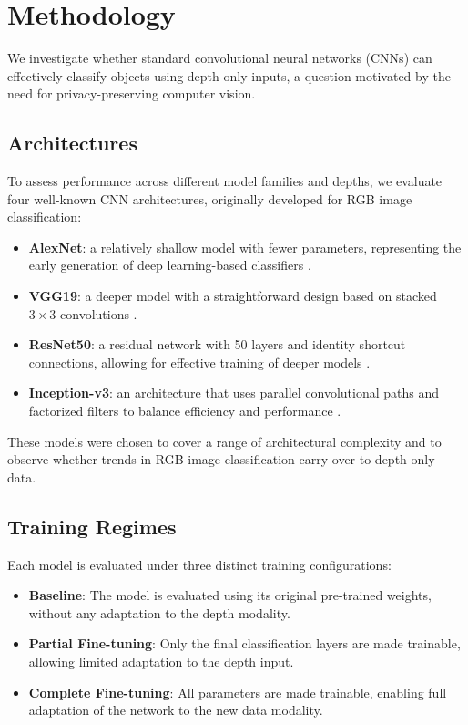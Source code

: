 \section{Methodology}

We investigate whether standard convolutional neural networks (CNNs) can effectively classify objects using depth-only inputs, a question motivated by the need for privacy-preserving computer vision.

\subsection{Architectures}

To assess performance across different model families and depths, we evaluate four well-known CNN architectures, originally developed for RGB image classification:

\begin{itemize}
    \item \textbf{AlexNet}: a relatively shallow model with fewer parameters, representing the early generation of deep learning-based classifiers \cite{alexnet}.
    \item \textbf{VGG19}: a deeper model with a straightforward design based on stacked $3 \times 3$ convolutions \cite{vgg19}.
    \item \textbf{ResNet50}: a residual network with 50 layers and identity shortcut connections, allowing for effective training of deeper models \cite{resnet50}.
    \item \textbf{Inception-v3}: an architecture that uses parallel convolutional paths and factorized filters to balance efficiency and performance \cite{inceptionv3}.
\end{itemize}

These models were chosen to cover a range of architectural complexity and to observe whether trends in RGB image classification carry over to depth-only data.

\subsection{Training Regimes}

Each model is evaluated under three distinct training configurations:
\begin{itemize}
    \item \textbf{Baseline}: The model is evaluated using its original pre-trained weights, without any adaptation to the depth modality.
    \item \textbf{Partial Fine-tuning}: Only the final classification layers are made trainable, allowing limited adaptation to the depth input.
    \item \textbf{Complete Fine-tuning}: All parameters are made trainable, enabling full adaptation of the network to the new data modality.
\end{itemize}

